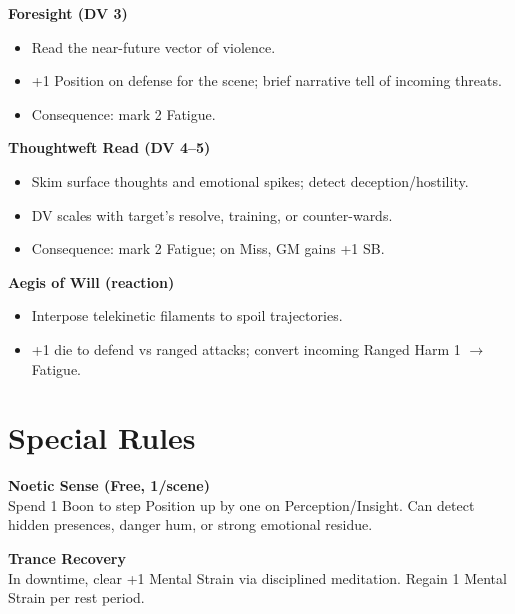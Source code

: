 \documentclass[11pt]{article}
\newenvironment{talentbox}[1]{%
  \begin{mdframed}[backgroundcolor=gray!10, linewidth=1pt, linecolor=gray!50]
  \textbf{#1}\\
}{\end{mdframed}}
\begin{document}
\begin{talentbox}{Foresight (DV 3)}
    \begin{itemize}[leftmargin=*]
        \item Read the near-future vector of violence.
        \item +1 Position on defense for the scene; brief narrative tell of incoming threats.
        \item Consequence: mark 2 Fatigue.
    \end{itemize}
\end{talentbox}

\begin{talentbox}{Thoughtweft Read (DV 4--5)}
    \begin{itemize}[leftmargin=*]
        \item Skim surface thoughts and emotional spikes; detect deception/hostility.
        \item DV scales with target's resolve, training, or counter-wards.
        \item Consequence: mark 2 Fatigue; on Miss, GM gains +1 SB.
    \end{itemize}
\end{talentbox}

\begin{talentbox}{Aegis of Will (reaction)}
    \begin{itemize}[leftmargin=*]
        \item Interpose telekinetic filaments to spoil trajectories.
        \item +1 die to defend vs ranged attacks; convert incoming Ranged Harm 1 $\rightarrow$ Fatigue.
    \end{itemize}
\end{talentbox}

\section*{Special Rules}

\begin{talentbox}{Noetic Sense (Free, 1/scene)}
    Spend 1 Boon to step Position up by one on Perception/Insight. Can detect hidden presences, danger hum, or strong emotional residue.
\end{talentbox}

\begin{talentbox}{Trance Recovery}
    In downtime, clear +1 Mental Strain via disciplined meditation. Regain 1 Mental Strain per rest period.
\end{talentbox}
\end{document}
